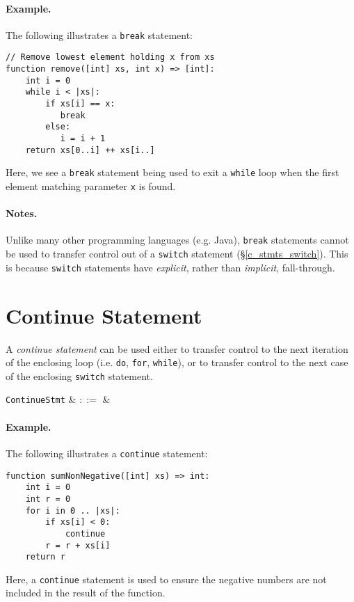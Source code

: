 \paragraph{Example.} The following illustrates a \lstinline{break} statement:

\begin{lstlisting}
// Remove lowest element holding x from xs
function remove([int] xs, int x) => [int]:
    int i = 0
    while i < |xs|:
        if xs[i] == x:
           break
        else:
           i = i + 1
    return xs[0..i] ++ xs[i..]
\end{lstlisting}
Here, we see a \lstinline{break} statement being used to exit a \lstinline{while} loop when the first element matching parameter \lstinline{x} is found.  

\paragraph{Notes.} Unlike many other programming languages (e.g. Java), \lstinline{break} statements cannot be used to transfer control out of a \lstinline{switch} statement (\S\ref{c_stmts_switch}).  This is because \lstinline{switch} statements have {\em explicit}, rather than {\em implicit}, fall-through.


\section{Continue Statement}
\label{c_stmts_continue}
A {\em continue statement} can be used either to transfer control to the next iteration of the enclosing loop (i.e. \lstinline{do}, \lstinline{for}, \lstinline{while}), or to transfer control to the next case of the enclosing \lstinline{switch} statement.

\begin{syntax}
  \verb+ContinueStmt+ & $::=$ & \\
\end{syntax}

\paragraph{Example.} The following illustrates a \lstinline{continue} statement:

\begin{lstlisting}
function sumNonNegative([int] xs) => int:
    int i = 0
    int r = 0
    for i in 0 .. |xs|:
        if xs[i] < 0:
            continue
        r = r + xs[i]
    return r
\end{lstlisting}
Here, a \lstinline{continue} statement is used to ensure the negative numbers are not included in the result of the function.

